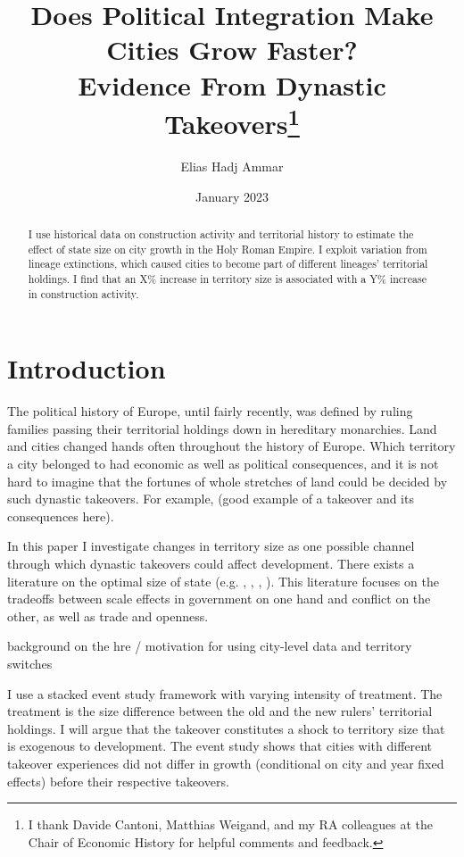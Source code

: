 \documentclass{article}
\title{Does Political Integration Make Cities Grow Faster?\\
Evidence From Dynastic Takeovers\footnote{I thank Davide Cantoni, Matthias Weigand, and my RA colleagues at the Chair of Economic History for helpful comments and feedback.}
}
\author{Elias Hadj Ammar}
\date{January 2023}
\begin{document}
\onehalfspacing
\maketitle
\thispagestyle{empty}

\begin{abstract}
I use historical data on construction activity and territorial history to estimate the effect of state size on city growth in the Holy Roman Empire. I exploit variation from lineage extinctions, which caused cities to become part of different lineages' territorial holdings. I find that an X\% increase in territory size is associated with a Y\% increase in construction activity.
\end{abstract}




\newpage

\setcounter{page}{1}
\doublespacing
 
\section{Introduction}

The political history of Europe, until fairly recently, was defined by ruling families passing their territorial holdings down in hereditary monarchies. Land and cities changed hands often throughout the history of Europe. Which territory a city belonged to had economic as well as political consequences, and it is not hard to imagine that the fortunes of whole stretches of land could be decided by such dynastic takeovers. For example, (good example of a takeover and its consequences here).

In this paper I investigate changes in territory size as one possible channel through which dynastic takeovers could affect development. There exists a literature on the optimal size of state (e.g. \cite{as1997}, \cite{aw1998}, \cite{asw2000}, \cite{easterly2000}). This literature focuses on the tradeoffs between scale effects in government on one hand and conflict on the other, as well as trade and openness.

background on the hre / motivation for using city-level data and territory switches

I use a stacked event study framework with varying intensity of treatment. The treatment is the size difference between the old and the new rulers' territorial holdings. I will argue that the takeover constitutes a shock to territory size that is exogenous to development. The event study shows that cities with different takeover experiences did not differ in growth (conditional on city and year fixed effects) before their respective takeovers. 
\end{document}
